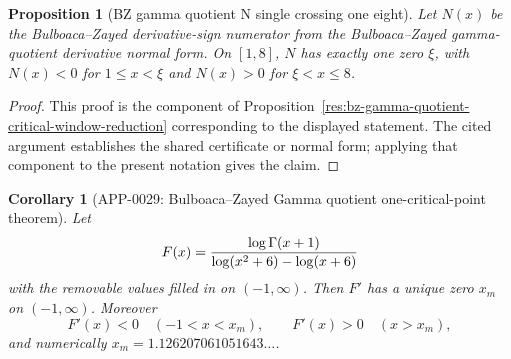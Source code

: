 \documentclass[11pt]{article}
\numberwithin{equation}{section}
\newtheorem{proposition}[theorem]{Proposition}
\newtheorem{corollary}[theorem]{Corollary}
\theoremstyle{definition}
\theoremstyle{remark}
\newcommand{\1}{\mathbf 1}
\begin{document}
\begin{proposition}[BZ gamma quotient N single crossing one eight]
\label{res:bz-gamma-quotient-n-single-crossing-one-eight}
Let \(N(x)\) be the Bulboaca--Zayed derivative-sign numerator from the Bulboaca--Zayed gamma-quotient derivative normal form. On \([1,8]\), \(N\) has exactly one zero \(\xi\), with \(N(x)<0\) for \(1\le x<\xi\) and \(N(x)>0\) for \(\xi<x\le8\).
\end{proposition}

\begin{proof}
This proof is the component of Proposition~\ref{res:bz-gamma-quotient-critical-window-reduction} corresponding to the displayed statement.  The cited argument establishes the shared certificate or normal form; applying that component to the present notation gives the claim.
\end{proof}

\begin{corollary}[APP-0029: Bulboaca--Zayed Gamma quotient one-critical-point theorem]
\label{thm:app29-bz-gamma-quotient}
Let
\[
 F(x)=
 {\log\Gamma(x+1)\over \log(x^2+6)-\log(x+6)}
\]
with the removable values filled in on \((-1,\infty)\).  Then \(F'\) has a
unique zero \(x_m\) on \((-1,\infty)\).  Moreover
\[
 F'(x)<0\quad(-1<x<x_m),\qquad
 F'(x)>0\quad(x>x_m),
\]
and numerically \(x_m=1.126207061051643\ldots\).


\end{corollary}
\end{document}
